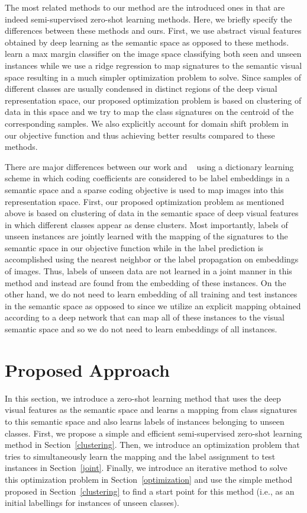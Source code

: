 \documentclass[10pt,twocolumn,letterpaper]{article}
\begin{document}
 The most related methods to our method are the introduced ones in \cite{li15max, semi15, Kodirov2015} that are indeed semi-supervised zero-shot learning methods. Here, we briefly specify the differences between these methods and ours. First, we use abstract visual features obtained by deep learning as the semantic space as opposed to these methods. \cite{li15max, semi15}
learn a max margin classifier on the image space classifying both seen and unseen instances while we use a ridge regression to map signatures to the semantic visual space resulting in a much simpler optimization problem to solve. Since samples of different classes are usually condensed in distinct regions of the deep visual representation space, our proposed optimization problem is based on clustering of data in this space and we try to map the class signatures on the centroid of the corresponding samples. We also explicitly account for domain shift problem in our objective function and thus achieving better results compared to these methods.

There are major differences between our work and ~\cite{Kodirov2015} using a dictionary learning scheme in which coding coefficients are considered to be label embeddings in a semantic space and a sparse coding objective is used to map images into this representation space. First, our proposed optimization problem as mentioned above is based on clustering of data in the semantic space of deep visual features in which different classes appear as dense clusters. Most importantly, labels of unseen instances are jointly learned with the mapping of the signatures to the semantic space in our objective function while in \cite{Kodirov2015} the label prediction is accomplished using the nearest neighbor or the label propagation on embeddings of images. Thus, labels of unseen data are not learned in a joint manner in this method and instead are found from the embedding of these instances. On the other hand, we do not need to learn embedding of all training and test instances in the semantic space as opposed to \cite{Kodirov2015} since we utilize an explicit mapping obtained according to a deep network that can map all of these instances to the visual semantic space and so we do not need to learn embeddings of all instances.

\section{Proposed Approach} \label{proposed}
In this section, we introduce a zero-shot learning method that uses the deep visual features as the semantic space and learns
a mapping from class signatures to this semantic space and also learns labels of instances belonging to unseen classes.
 First, we propose a simple and efficient semi-supervised zero-shot learning method in Section~\ref{clustering}.
  Then, we introduce an optimization problem that tries to simultaneously learn the mapping and the label assignment to test instances in Section~\ref{joint}.
   Finally, we introduce an iterative method to solve this optimization problem in Section~\ref{optimization}
   and use the simple method proposed in Section~\ref{clustering} to find a start point for this method (i.e., as an initial labellings for instances of unseen classes).
\end{document}

